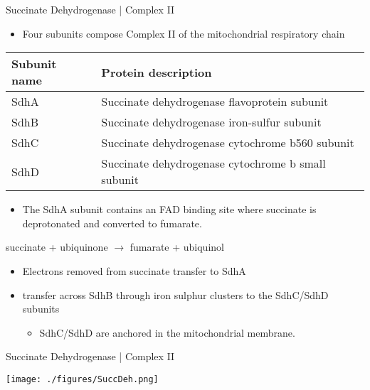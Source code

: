 \documentclass[presentation, smaller]{beamer}
\begin{document}
\begin{frame}[label={sec:org292cbfb}]{Succinate Dehydrogenase | Complex II}
\begin{itemize}
\item Four subunits compose Complex II of the mitochondrial respiratory chain
\end{itemize}

\begin{center}
\begin{tabular}{ll}
Subunit name & Protein description\\
\hline
SdhA & Succinate dehydrogenase flavoprotein subunit\\
SdhB & Succinate dehydrogenase iron-sulfur subunit\\
SdhC & Succinate dehydrogenase cytochrome b560 subunit\\
SdhD & Succinate dehydrogenase cytochrome b small subunit\\
\end{tabular}
\end{center}

\begin{itemize}
\item The SdhA subunit contains an FAD binding site where succinate
is deprotonated and converted to fumarate.
\end{itemize}

succinate + ubiquinone \(\to\) fumarate + ubiquinol

\begin{itemize}
\item Electrons removed from succinate transfer to SdhA
\item transfer across SdhB through iron sulphur clusters to the SdhC/SdhD subunits
\begin{itemize}
\item SdhC/SdhD are anchored in the mitochondrial membrane.
\end{itemize}
\end{itemize}
\end{frame}

\begin{frame}[label={sec:org902c853}]{Succinate Dehydrogenase | Complex II}
\begin{center}
\texttt{[image: ./figures/SuccDeh.png]}
\end{center}
\end{frame}
\end{document}
